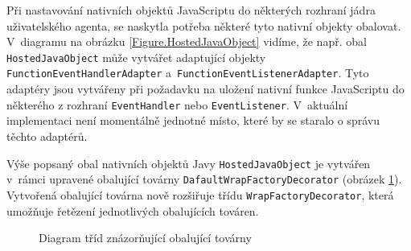 Při nastavování nativních objektů JavaScriptu do některých rozhraní jádra uživatelského agenta, se naskytla potřeba některé tyto nativní objekty obalovat. V~diagramu na obrázku \ref{Figure.HostedJavaObject} vidíme, že např. obal \texttt{HostedJavaObject} může vytvářet adaptující objekty \texttt{FunctionEventHandlerAdapter} a~\texttt{FunctionEventListenerAdapter}. Tyto adaptéry jsou vytvářeny při požadavku na uložení nativní funkce JavaScriptu do některého z rozhraní \texttt{EventHandler} nebo \texttt{EventListener}. V~aktuální implementaci není momentálně jednotné místo, které by se staralo o správu těchto adaptérů.

Výše popsaný obal nativních objektů Javy \texttt{HostedJavaObject} je vytvářen v~rámci upravené obalující továrny \texttt{DafaultWrapFactoryDecorator} (obrázek \ref{Figure.WrapFactoryDecorator}). Vytvořená obalující továrna nově rozšiřuje třídu \texttt{WrapFactoryDecorator}, která umožňuje řetězení jednotlivých obalujících továren. 

\begin{figure}[H]
  \begin{center}
    \caption{Diagram tříd znázorňující obalující továrny}
    \label{Figure.WrapFactoryDecorator}
  \end{center}
\end{figure}

